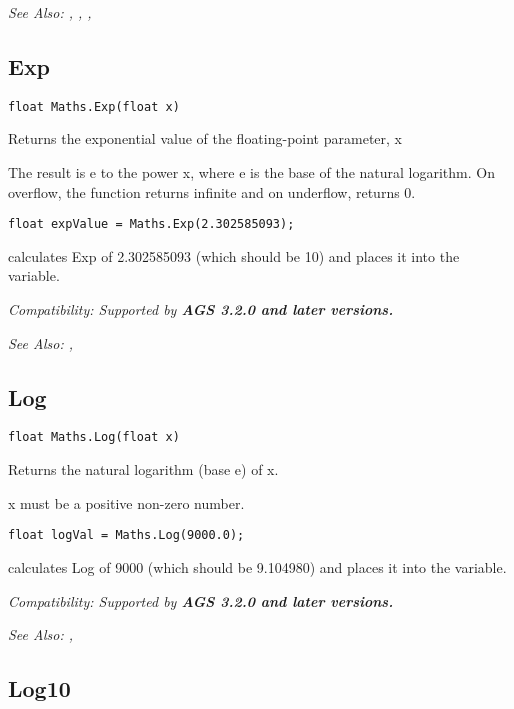 \it{See Also:} ,
,
, 


\subsection{Exp}\label{Maths.Exp}%

\begin{verbatim}
float Maths.Exp(float x)
\end{verbatim}
Returns the exponential value of the floating-point parameter, x

The result is e to the power x, where e is the base of the natural logarithm.
On overflow, the function returns infinite and on underflow, returns 0.

\begin{verbatim}
float expValue = Maths.Exp(2.302585093);
\end{verbatim}
calculates Exp of 2.302585093 (which should be 10) and places it into the variable.

\it{Compatibility:} Supported by \bf{AGS 3.2.0} and later versions.

\it{See Also:} , 


\subsection{Log}\label{Maths.Log}%

\begin{verbatim}
float Maths.Log(float x)
\end{verbatim}
Returns the natural logarithm (base e) of x.

x must be a positive non-zero number.

\begin{verbatim}
float logVal = Maths.Log(9000.0);
\end{verbatim}
calculates Log of 9000 (which should be 9.104980) and places it into the variable.

\it{Compatibility:} Supported by \bf{AGS 3.2.0} and later versions.

\it{See Also:} , 


\subsection{Log10}\label{Maths.Log10}%

